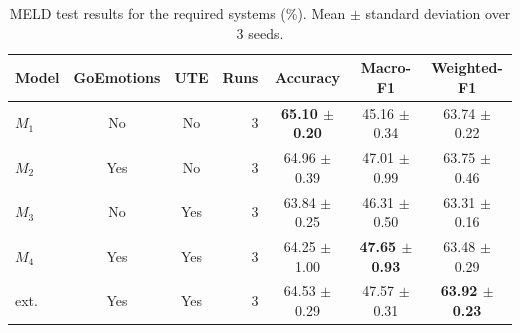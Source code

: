 \begin{table}[t]
\centering
\caption{MELD test results for the required systems (\%). Mean $\pm$ standard deviation over 3 seeds.}
\label{tab:main}
\begin{tabular}{lccrccc}
\toprule
Model & GoEmotions & UTE & Runs & Accuracy & Macro-F1 & Weighted-F1 \\
\midrule
$M_1$ & No & No & 3 & \textbf{65.10 $\pm$ 0.20} & 45.16 $\pm$ 0.34 & 63.74 $\pm$ 0.22 \\
$M_2$ & Yes & No & 3 & 64.96 $\pm$ 0.39 & 47.01 $\pm$ 0.99 & 63.75 $\pm$ 0.46 \\
$M_3$ & No & Yes & 3 & 63.84 $\pm$ 0.25 & 46.31 $\pm$ 0.50 & 63.31 $\pm$ 0.16 \\
$M_4$ & Yes & Yes & 3 & 64.25 $\pm$ 1.00 & \textbf{47.65 $\pm$ 0.93} & 63.48 $\pm$ 0.29 \\
ext. & Yes & Yes & 3 & 64.53 $\pm$ 0.29 & 47.57 $\pm$ 0.31 & \textbf{63.92 $\pm$ 0.23} \\
\bottomrule
\end{tabular}
\end{table}
